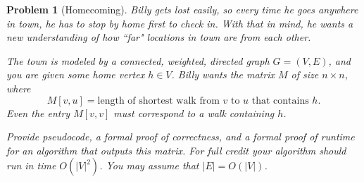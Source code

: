 \documentclass[10pt]{article}
\newtheorem{problem}{\sc\color{cit}Problem}
\begin{document}
\begin{problem}[Homecoming]
Billy gets lost easily, so every time he goes anywhere in town, he has to stop by home first to check in. With that in mind, he wants a new understanding of how ``far" locations in town are from each other. 

The town is modeled by a connected, weighted, directed graph $G=(V, E)$, and you are given some home vertex $h \in V$. Billy wants the matrix $M$ of size $n \times n$, where 
\[ 
    M[v, u] = \text{length of shortest walk from }v\text{ to }u \text{ that contains }h.
\]
Even the entry $M[v, v]$ must correspond to a walk containing $h$.

Provide pseudocode, a formal proof of correctness, and a formal proof of runtime for an algorithm that outputs this matrix. For full credit your algorithm should run in time $O(|V|^2)$. You may assume that $|E| = O(|V|)$. 
\end{problem}
\end{document}
